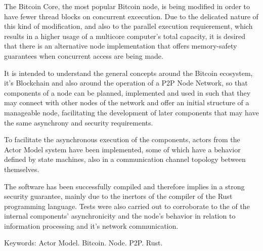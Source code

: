 \begin{resumo}[Abstract]
The Bitcoin Core, the most popular Bitcoin node, is being modified in order to have fewer thread blocks on concurrent excecution. Due to the delicated nature of this kind of modification, and also to the parallel execution requierement, which results in a higher usage of a multicore computer's total capacity, it is desired that there is an alternative node implementation that offers memory-safety guarantees when concurrent access are being made.

It is intended to understand the general concepts around the Bitcoin ecosystem, it's Blockchain and also around the operation of a P2P Node Network, so that components of a node can be planned, implemented and used in such that they may connect with other nodes of the network and offer an initial structure of a manageable node, facilitating the development of later components that may have the same asynchrony and security requirements.

To facilitate the asynchronous execution of the components, actors from the Actor Model system have been implemented, some of which have a behavior defined by state machines, also in a communication channel topology between themselves.

The software has been successfully compiled and therefore implies in a strong security guarantee, mainly due to the inertors of the compiler of the Rust programming language. Tests were also carried out to corroborate to the of the internal components' asynchronicity and the node's behavior in relation to information processing and it's network communication.

Keywords: Actor Model. Bitcoin. Node. P2P. Rust.

\end{resumo}


\listoffigures*
\cleardoublepage


